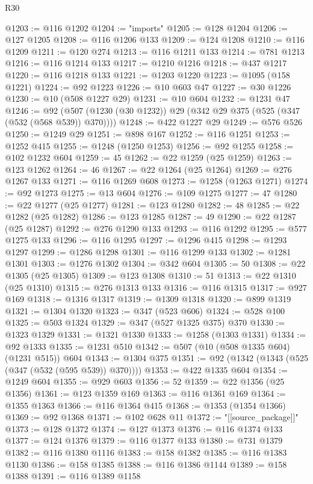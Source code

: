 \begin{lexlean}{R30}
\begin{coremodule}
@1203 := @116 @1202
@1204 := "imports"
@1205 := @128 @1204
@1206 := @127 @1205
@1208 := @116 @1206 @133
@1209 := @124 @1208
@1210 := @116 @1209
@1211 := @120 @274
@1213 := @116 @1211 @133
@1214 := @781 @1213
@1216 := @116 @1214 @133
@1217 := @1210 @1216
@1218 := @437 @1217
@1220 := @116 @1218 @133
@1221 := @1203 @1220
@1223 := @1095 (@158 @1221)
@1224 := @92 @1223
@1226 := @10 @603 @47
@1227 := @30 @1226
@1230 := @10 (@508 @1227 @29)
@1231 := @10 @604
@1232 := @1231 @47
@1246 := @92 (@507 (@1230 (@30 @1232)) @29 (@342 @29 @375 (@525 (@347 (@532 (@568 @539)) @370))))
@1248 := @422 @1227 @29
@1249 := @576 @526
@1250 := @1249 @29
@1251 := @898 @167
@1252 := @116 @1251
@1253 := @1252 @415
@1255 := @1248 (@1250 @1253)
@1256 := @92 @1255
@1258 := @102 @1232 @604
@1259 := 45
@1262 := @22 @1259 (@25 @1259)
@1263 := @123 @1262
@1264 := 46
@1267 := @22 @1264 (@25 @1264)
@1269 := @276 @1267 @133
@1271 := @116 @1269 @608
@1273 := @1258 (@1263 @1271)
@1274 := @92 @1273
@1275 := @13 @604
@1276 := @109 @1275
@1277 := 47
@1280 := @22 @1277 (@25 @1277)
@1281 := @123 @1280
@1282 := 48
@1285 := @22 @1282 (@25 @1282)
@1286 := @123 @1285
@1287 := 49
@1290 := @22 @1287 (@25 @1287)
@1292 := @276 @1290 @133
@1293 := @116 @1292
@1295 := @577 @1275 @133
@1296 := @116 @1295
@1297 := @1296 @415
@1298 := @1293 @1297
@1299 := @1286 @1298
@1301 := @116 @1299 @133
@1302 := @1281 @1301
@1303 := @1276 @1302
@1304 := @342 @604
@1305 := 50
@1308 := @22 @1305 (@25 @1305)
@1309 := @123 @1308
@1310 := 51
@1313 := @22 @1310 (@25 @1310)
@1315 := @276 @1313 @133
@1316 := @116 @1315
@1317 := @927 @169
@1318 := @1316 @1317
@1319 := @1309 @1318
@1320 := @899 @1319
@1321 := @1304 @1320
@1323 := @347 (@523 @606)
@1324 := @528 @100
@1325 := @503 @1324
@1329 := @347 (@527 @1325 @375) @370
@1330 := @1323 @1329
@1331 := @1321 @1330
@1333 := @1258 (@1303 @1331)
@1334 := @92 @1333
@1335 := @1231 @510
@1342 := @507 (@10 (@508 @1335 @604) (@1231 @515)) @604
@1343 := @1304 @375
@1351 := @92 (@1342 (@1343 (@525 (@347 (@532 (@595 @539)) @370))))
@1353 := @422 @1335 @604
@1354 := @1249 @604
@1355 := @929 @603
@1356 := 52
@1359 := @22 @1356 (@25 @1356)
@1361 := @123 @1359 @169
@1363 := @116 @1361 @169
@1364 := @1355 @1363
@1366 := @116 @1364 @415
@1368 := @1353 (@1354 @1366)
@1369 := @92 @1368
@1371 := @102 @628 @11
@1372 := "[[source_package]]"
@1373 := @128 @1372
@1374 := @127 @1373
@1376 := @116 @1374 @133
@1377 := @124 @1376
@1379 := @116 @1377 @133
@1380 := @731 @1379
@1382 := @116 @1380 @1116
@1383 := @158 @1382
@1385 := @116 @1383 @1130
@1386 := @158 @1385
@1388 := @116 @1386 @1144
@1389 := @158 @1388
@1391 := @116 @1389 @1158

\end{coremodule}
\end{lexlean}
